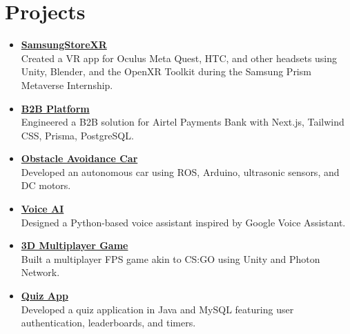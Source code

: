 \documentclass[a4paper,10pt]{article}
\newcommand{\sectionbreak}{\vspace{0.2em}}
\begin{document}
\sectionbreak

\section{Projects}
\begin{itemize}[noitemsep, topsep=0pt]
    \item \href{https://github.com/Shival-Gupta/SamsungStoreXR}{\textcolor{accentcolor}{\textbf{SamsungStoreXR}}} \\
    Created a VR app for Oculus Meta Quest, HTC, and other headsets using Unity, Blender, and the OpenXR Toolkit during the Samsung Prism Metaverse Internship.
    
    \item \href{https://b2b-portal-rho.vercel.app/}{\textcolor{accentcolor}{\textbf{B2B Platform}}} \\
    Engineered a B2B solution for Airtel Payments Bank with Next.js, Tailwind CSS, Prisma, PostgreSQL.
    
    \item \href{https://github.com/Shival-Gupta/obstacle-avoidance-car-ros-noetic}{\textcolor{accentcolor}{\textbf{Obstacle Avoidance Car}}} \\
    Developed an autonomous car using ROS, Arduino, ultrasonic sensors, and DC motors.
    
    \item \href{https://github.com/Shival-Gupta/VoiceAI}{\textcolor{accentcolor}{\textbf{Voice AI}}} \\
    Designed a Python-based voice assistant inspired by Google Voice Assistant.
    
    \item \href{https://github.com/Shival-Gupta/WarGame}{\textcolor{accentcolor}{\textbf{3D Multiplayer Game}}} \\
    Built a multiplayer FPS game akin to CS:GO using Unity and Photon Network.
    
    \item \href{https://github.com/Shival-Gupta/QuizApp}{\textcolor{accentcolor}{\textbf{Quiz App}}} \\
    Developed a quiz application in Java and MySQL featuring user authentication, leaderboards, and timers.
\end{itemize}

\sectionbreak

\end{document}
